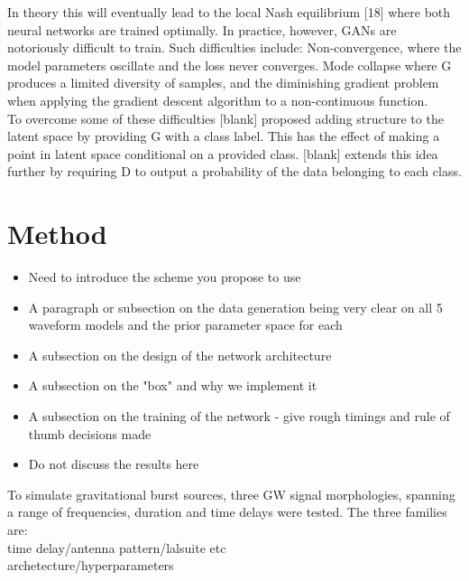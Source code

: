\documentclass[%
 reprint,
 amsmath,amssymb,
 aps,
]{revtex4-2}
\begin{document}
In theory this will eventually lead to the local Nash equilibrium [18] where
both neural networks are trained optimally. In practice, however, GANs are
notoriously difficult to train. Such difficulties include: Non-convergence,
where the model parameters oscillate and the loss never converges. Mode
collapse where G produces a limited diversity of samples, and the diminishing
gradient problem when applying the gradient descent algorithm to a
non-continuous function.  \\ To overcome some of these difficulties [blank]
proposed adding structure to the latent space by providing G with a class
label. This has the effect of making a point in latent space conditional on a
provided class. [blank] extends this idea further by requiring D to output a
probability of the data belonging to each class. 

\section{Method}

\begin{itemize}
\item Need to introduce the scheme you propose to use
\item A paragraph or subsection on the data generation being very clear on all
5 waveform models and the prior parameter space for each
\item A subsection on the design of the network architecture
\item A subsection on the "box" and why we implement it
\item A subsection on the training of the network - give rough timings and rule
of thumb decisions made
\item Do not discuss the results here 
\end{itemize}

To simulate gravitational burst sources, three GW signal morphologies, spanning a range of frequencies, duration and time delays were tested. The three families are:\\

time delay/antenna pattern/lalsuite etc \\

archetecture/hyperparameters

\end{document}
